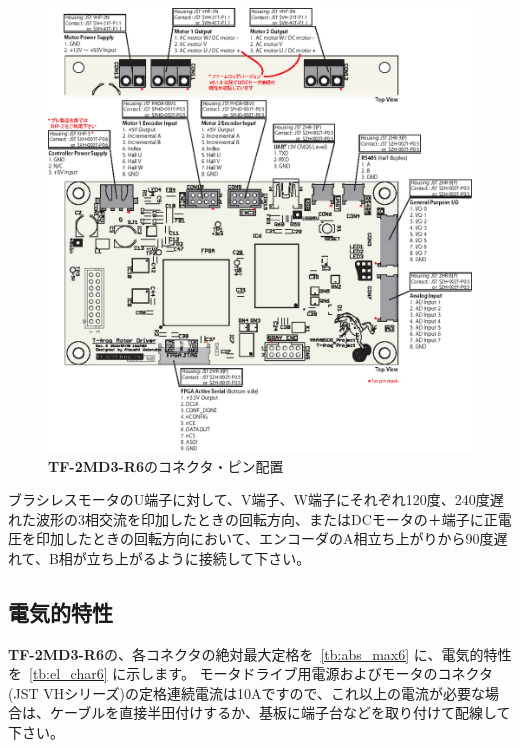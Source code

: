 \documentclass[11pt,a4j,openany]{jbook}
\begin{document}
\begin{figure}[H]
\centering\includegraphics[width=160mm]{pin-description-r6.eps}
\caption{{\bf TF-2MD3-R6}のコネクタ・ピン配置}
\label{fig:connector6}
\end{figure}

ブラシレスモータのU端子に対して、V端子、W端子にそれぞれ120度、240度遅れた波形の3相交流を印加したときの回転方向、またはDCモータの＋端子に正電圧を印加したときの回転方向において、エンコーダのA相立ち上がりから90度遅れて、B相が立ち上がるように接続して下さい。
\par


\subsection{電気的特性}
\label{sec:電気的特性}

{\bf TF-2MD3-R6}の、各コネクタの絶対最大定格を\tablename~\ref{tb:abs_max6} に、電気的特性を\tablename~\ref{tb:el_char6} に示します。
モータドライブ用電源およびモータのコネクタ(JST VHシリーズ)の定格連続電流は10Aですので、これ以上の電流が必要な場合は、ケーブルを直接半田付けするか、基板に端子台などを取り付けて配線して下さい。\par
\end{document}
